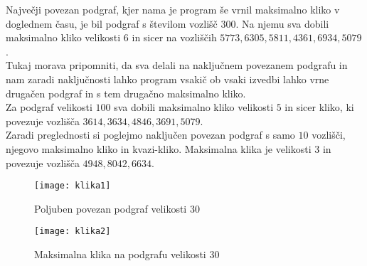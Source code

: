 \documentclass[12pt,a4paper]{amsart}
\theoremstyle{definition}
\theoremstyle{plain}
\begin{document}
Največji povezan podgraf, kjer nama je program še vrnil maksimalno kliko v doglednem času, je bil podgraf s številom vozlišč $300$. Na njemu sva dobili maksimalno kliko velikosti $6$ in sicer na vozliščih $5773, 6305, 5811, 4361, 6934, 5079$ .\\

Tukaj morava pripomniti, da sva delali na naključnem povezanem podgrafu in nam zaradi naključnosti lahko program vsakič ob vsaki izvedbi lahko vrne drugačen podgraf in s tem drugačno maksimalno kliko.\\

Za podgraf velikosti $100$ sva dobili maksimalno kliko velikosti $5$ in sicer kliko, ki povezuje vozlišča $3614, 3634, 4846, 3691, 5079$.\\

Zaradi preglednosti si poglejmo naključen povezan podgraf s samo $10$ vozlišči, njegovo maksimalno kliko in kvazi-kliko.
Maksimalna klika je velikosti $3$ in povezuje vozlišča $4948, 8042, 6634$. 

\begin{figure}[h]
\caption{Poljuben povezan podgraf velikosti 30}
\centering
\texttt{[image: klika1]}
\end{figure}

\begin{figure}[h]
\caption{Maksimalna klika na podgrafu velikosti 30}
\centering
\texttt{[image: klika2]}
\end{figure}




\end{document}

